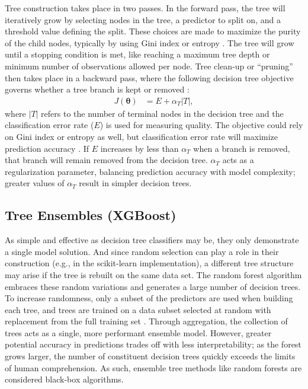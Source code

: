 Tree construction takes place in two passes. In the forward pass, the tree will iteratively grow by selecting nodes in the tree, a predictor to split on, and a threshold value defining the split. These choices are made to maximize the purity of the child nodes, typically by using Gini index or entropy \citep[p.\ 307]{james_introduction_2013}. The tree will grow until a stopping condition is met, like reaching a maximum tree depth or minimum number of observations allowed per node. Tree clean-up or ``pruning'' then takes place in a backward pass, where the following decision tree objective governs whether a tree branch is kept or removed \citep[p.\ 309]{james_introduction_2013}:
\begin{equation}
\label{dtree_objective}
\begin{aligned}
    J(\boldsymbol\theta) &= E + \alpha_T\left|T\right|,
\end{aligned}
\end{equation}
where $\left|T\right|$ refers to the number of terminal nodes in the decision tree and the classification error rate ($E$) is used for measuring quality. The objective could rely on Gini index or entropy as well, but classification error rate will maximize prediction accuracy \citep[p.\ 312]{james_introduction_2013}. If $E$ increases by less than $\alpha_T$ when a branch is removed, that branch will remain removed from the decision tree. $\alpha_T$ acts as a regularization parameter, balancing prediction accuracy with model complexity; greater values of $\alpha_T$ result in simpler decision trees.

\subsection{Tree Ensembles (XGBoost)}\label{ch3:tree_ensembles}

As simple and effective as decision tree classifiers may be, they only demonstrate a single model solution. And since random selection can play a role in their construction (e.g., in the scikit-learn implementation), a different tree structure may arise if the tree is rebuilt on the same data set. The random forest algorithm embraces these random variations and generates a large number of decision trees. To increase randomness, only a subset of the predictors are used when building each tree, and trees are trained on a data subset selected at random with replacement from the full training set \citep[p.\ 376--377]{bertsimas_analytics_2016}. Through aggregation, %
the collection of trees acts as a single, more performant ensemble model. However, greater potential accuracy in predictions trades off with less interpretability; as the forest grows larger, the number of constituent decision trees quickly exceeds the limits of human comprehension. As such, ensemble tree methods like random forests are considered black-box algorithms.


